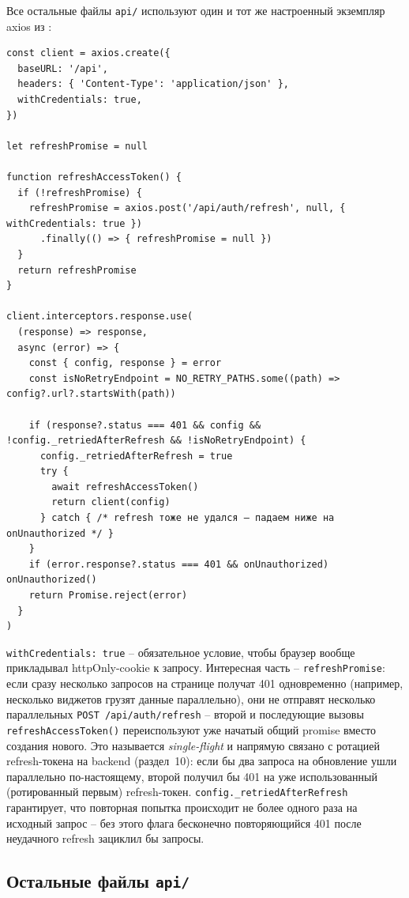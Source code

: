Все остальные файлы \texttt{api/} используют один и тот же настроенный
экземпляр axios из :
\begin{verbatim}
const client = axios.create({
  baseURL: '/api',
  headers: { 'Content-Type': 'application/json' },
  withCredentials: true,
})

let refreshPromise = null

function refreshAccessToken() {
  if (!refreshPromise) {
    refreshPromise = axios.post('/api/auth/refresh', null, { withCredentials: true })
      .finally(() => { refreshPromise = null })
  }
  return refreshPromise
}

client.interceptors.response.use(
  (response) => response,
  async (error) => {
    const { config, response } = error
    const isNoRetryEndpoint = NO_RETRY_PATHS.some((path) => config?.url?.startsWith(path))

    if (response?.status === 401 && config && !config._retriedAfterRefresh && !isNoRetryEndpoint) {
      config._retriedAfterRefresh = true
      try {
        await refreshAccessToken()
        return client(config)
      } catch { /* refresh тоже не удался — падаем ниже на onUnauthorized */ }
    }
    if (error.response?.status === 401 && onUnauthorized) onUnauthorized()
    return Promise.reject(error)
  }
)
\end{verbatim}
\texttt{withCredentials: true} -- обязательное условие, чтобы браузер
вообще прикладывал httpOnly-cookie к запросу. Интересная часть --
\texttt{refreshPromise}: если сразу несколько запросов на странице
получат 401 одновременно (например, несколько виджетов грузят данные
параллельно), они не отправят несколько параллельных
\texttt{POST /api/auth/refresh} -- второй и последующие вызовы
\texttt{refreshAccessToken()} переиспользуют уже начатый общий promise
вместо создания нового. Это называется \emph{single-flight} и напрямую
связано с ротацией refresh-токена на backend (раздел~10): если бы два
запроса на обновление ушли параллельно по-настоящему, второй получил бы
401 на уже использованный (ротированный первым) refresh-токен.
\texttt{config._retriedAfterRefresh} гарантирует, что повторная попытка
происходит не более одного раза на исходный запрос -- без этого флага
бесконечно повторяющийся 401 после неудачного refresh зациклил бы
запросы.

\subsection{Остальные файлы \texttt{api/}}

